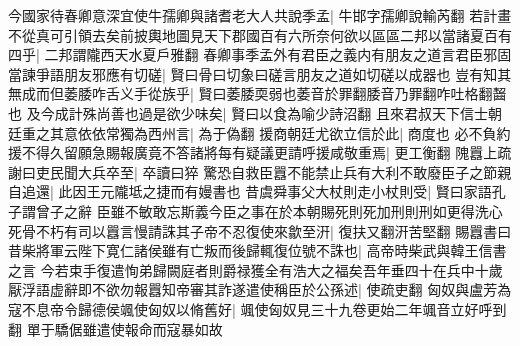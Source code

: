 今國家待春卿意深宜使牛孺卿與諸耆老大人共說季孟|{
	牛邯字孺卿說輸芮翻}
若計畫不從真可引領去矣前披輿地圖見天下郡國百有六所奈何欲以區區二邦以當諸夏百有四乎|{
	二邦謂隴西天水夏戶雅翻}
春卿事季孟外有君臣之義内有朋友之道言君臣邪固當諫爭語朋友邪應有切磋|{
	賢曰骨曰切象曰磋言朋友之道如切磋以成器也}
豈有知其無成而但萎腇咋舌义手從族乎|{
	賢曰萎腇耎弱也萎音於罪翻腇音乃罪翻咋吐格翻齧也}
及今成計殊尚善也過是欲少味矣|{
	賢曰以食為喻少詩沼翻}
且來君叔天下信士朝廷重之其意依依常獨為西州言|{
	為于偽翻}
援商朝廷尤欲立信於此|{
	商度也}
必不負約援不得久留願急賜報廣竟不答諸將每有疑議更請呼援咸敬重焉|{
	更工衡翻}
隗囂上疏謝曰吏民聞大兵卒至|{
	卒讀曰猝}
驚恐自救臣囂不能禁止兵有大利不敢廢臣子之節親自追還|{
	此因王元隴坻之捷而有嫚書也}
昔虞舜事父大杖則走小杖則受|{
	賢曰家語孔子謂曾子之辭}
臣雖不敏敢忘斯義今臣之事在於本朝賜死則死加刑則刑如更得洗心死骨不朽有司以囂言慢請誅其子帝不忍復使來歙至汧|{
	復扶又翻汧苦堅翻}
賜囂書曰昔柴將軍云陛下寛仁諸侯雖有亡叛而後歸輒復位號不誅也|{
	高帝時柴武與韓王信書之言}
今若束手復遣恂弟歸闕庭者則爵禄獲全有浩大之福矣吾年垂四十在兵中十歲厭浮語虚辭即不欲勿報囂知帝審其詐遂遣使稱臣於公孫述|{
	使疏吏翻}
匈奴與盧芳為寇不息帝令歸德侯颯使匈奴以脩舊好|{
	颯使匈奴見三十九卷更始二年颯音立好呼到翻}
單于驕倨雖遣使報命而寇暴如故

